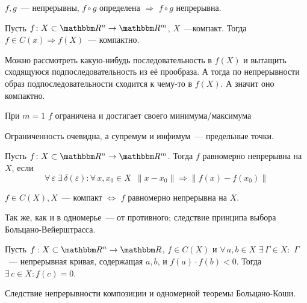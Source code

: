 \documentclass[12pt]{../../notes}
\begin{document}
\begin{imp}\label{stat:contsuperpos}
  $f, g$~--- непрерывны, $f\circ g$ определена $\Rightarrow$ $f\circ g$ непрерывна.
\end{imp} 

\begin{thrm}[Вейерштрасса]\label{thrm:weierRn}
  Пусть $f\colon X \subset \R^n \to \R^m$, $X$~---компакт. 
  Тогда $f\in C(x) \Rightarrow  f(X)$~--- компактно.
\end{thrm}
\begin{ittproof}
  Можно рассмотреть какую-нибудь последовательность в $f(X)$ и  вытащить сходящуюся подпоследовательность
  из её прообраза. А тогда по непрерывности образ подпоследовательности сходится к чему-то в $f(X)$.
  А значит оно компактно.
\end{ittproof}

\begin{imp}
  При $m=1$ $f$ ограничена и достигает своего минимума/максимума
\end{imp}

\begin{itlproof}
  Ограниченность очевидна, а супремум и инфимум~--- предельные точки.
\end{itlproof}

\begin{defn}\label{defn:unicontRn}
  Пусть $f\colon X \subset \R^n \to \R^m$. Тогда $f$ равномерно непрерывна на $X$, если
  \[
    \forall\, \varepsilon \; \exists\, \delta(\varepsilon) \colon \forall\,x,x_0\in X 
    \;\:\| x - x_0 \| \Rightarrow \| f(x) - f(x_0) \|
  \]
\end{defn}

\begin{thrm}[Кантора]\label{thrm:cantRn}
  $f\in C(X), X$~--- компакт $ \Leftrightarrow$ $f$ равномерно непрерывна на $X$.
\end{thrm}
\begin{ittproof}
  Так же, как и в одномерье~--- от противного; следствие принципа выбора Больцано-Вейерштрасса.
\end{ittproof}

\begin{thrm}\label{thrm:bolzcauchyRn}
  Пусть $f : X\subset \R^n\to \R$, $f\in C(X)$ и $\forall\,a,b \in X $ $\exists\,\Gamma \in X \colon$
  $\Gamma$~--- непрерывная кривая, содержащая $a, b$, и $f(a)\cdot f(b) < 0$. Тогда
  $\exists\, c \in X \colon f(c) = 0$.
\end{thrm}
\begin{ittproof}
  Следствие непрерывности композиции и одномерной теоремы Больцано-Коши.
\end{ittproof}
\end{document}
